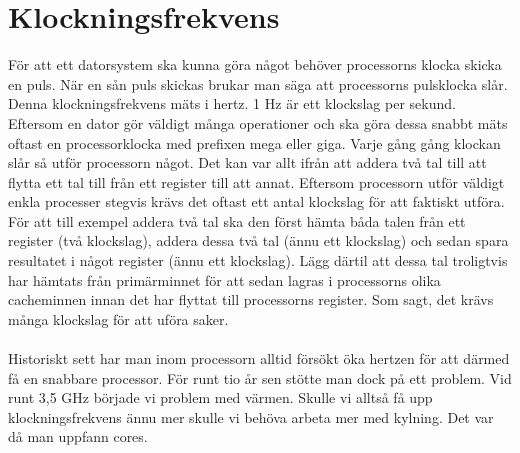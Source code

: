 \documentclass[12pt, letterpaper]{report}
\begin{document}
\section{Klockningsfrekvens}
För att ett datorsystem ska kunna göra något behöver processorns klocka skicka en puls. 
När en sån puls skickas brukar man säga att processorns pulsklocka slår. Denna klockningsfrekvens mäts i hertz. 1 Hz är ett klockslag per sekund. Eftersom en dator gör väldigt många operationer och ska göra dessa snabbt mäts oftast en processorklocka med prefixen mega eller giga. Varje gång gång klockan slår så utför processorn något. Det kan var allt ifrån att addera två tal till att flytta ett tal till från ett register till att annat. Eftersom processorn utför väldigt enkla processer stegvis krävs det oftast ett antal klockslag för att faktiskt utföra. För att till exempel addera två tal ska den först hämta båda talen från ett register (två klockslag), addera dessa två tal (ännu ett klockslag) och sedan spara resultatet i något register (ännu ett klockslag). Lägg därtil att dessa tal troligtvis har hämtats från primärminnet för att sedan lagras i processorns olika cacheminnen innan det har flyttat till processorns register. Som sagt, det krävs många klockslag för att uföra saker.\\\\
Historiskt sett har man inom processorn alltid försökt öka hertzen för att därmed få en snabbare processor. För runt tio år sen stötte man dock på ett problem. Vid runt 3,5 GHz började vi problem med värmen. Skulle vi alltså få upp klockningsfrekvens ännu mer skulle vi behöva arbeta mer med kylning. Det var då man uppfann cores. 
\end{document}
